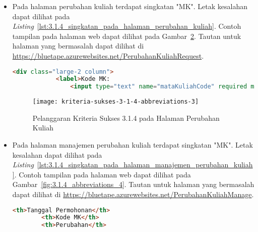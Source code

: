 \begin{itemize}
    \begin{figure}[H]
        \centering  
        \texttt{[image: kriteria-sukses-3-1-4-abbreviations-2]}  
        \caption[Pelanggaran Kriteria Sukses 3.1.4 pada Halaman Manajemen Cetak Transkrip]{Pelanggaran Kriteria Sukses 3.1.4 pada Halaman Manajemen Cetak Transkrip}
        \label{fig:3.1.4_abbreviations_2}  
    \end{figure}
    
    \item Pada halaman perubahan kuliah terdapat singkatan "MK". Letak kesalahan dapat dilihat pada \mbox{\textit{Listing} \ref{lst:3.1.4_singkatan_pada_halaman_perubahan_kuliah}}. Contoh tampilan pada halaman web dapat dilihat pada \mbox{Gambar \ref{fig:3.1.4_abbreviations_3}}. Tautan untuk halaman yang bermasalah dapat dilihat di \url{https://bluetape.azurewebsites.net/PerubahanKuliahRequest}.
    \begin{lstlisting}[frame=single, label={lst:3.1.4_singkatan_pada_halaman_perubahan_kuliah}, language=HTML, caption=Pelanggaran Kriteria Sukses 3.1.4 pada Halaman Perubahan Kuliah]
        <div class="large-2 column">
            <label>Kode MK:
                <input type="text" name="mataKuliahCode" required maxlength="9" pattern="[A-Z]{3}[0-9]{3}([0-9]{3})?" title="Kode MK dalam format XYZ123"/>
    \end{lstlisting}

    \begin{figure}[H]
        \centering  
        \texttt{[image: kriteria-sukses-3-1-4-abbreviations-3]}  
        \caption[Pelanggaran Kriteria Sukses 3.1.4 pada Halaman Perubahan Kuliah]{Pelanggaran Kriteria Sukses 3.1.4 pada Halaman Perubahan Kuliah}
        \label{fig:3.1.4_abbreviations_3}  
    \end{figure}
    
    \item Pada halaman manajemen perubahan kuliah terdapat singkatan "MK". Letak kesalahan dapat dilihat pada \mbox{\textit{Listing} \ref{lst:3.1.4_singkatan_pada_halaman_manajemen_perubahan_kuliah}}. Contoh tampilan pada halaman web dapat dilihat pada \mbox{Gambar \ref{fig:3.1.4_abbreviations_4}}. Tautan untuk halaman yang bermasalah dapat dilihat di \url{https://bluetape.azurewebsites.net/PerubahanKuliahManage}.
    \begin{lstlisting}[frame=single, label={lst:3.1.4_singkatan_pada_halaman_manajemen_perubahan_kuliah}, language=HTML, caption=Pelanggaran Kriteria Sukses 3.1.4 pada Halaman Manajemen Perubahan Kuliah]
        <th>Tanggal Permohonan</th>
        <th>Kode MK</th>
        <th>Perubahan</th>
    \end{lstlisting}


\end{itemize}
